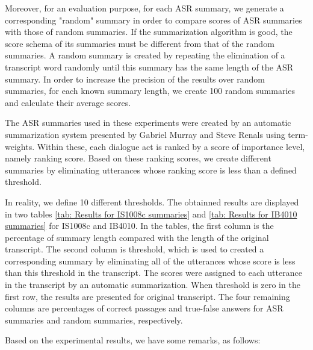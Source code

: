 Moreover, for an evaluation purpose, for each ASR summary, we generate a corresponding "random" summary in order to compare scores of ASR summaries with those of random summaries. If the summarization algorithm is good, the score schema of its summaries must be different from that of the random summaries. A random summary is created by repeating the elimination of a transcript word randomly until this summary has the same length of the ASR summary. In order to increase the precision of the results over random summaries, for each known summary length, we create 100 random summaries and calculate their average scores.

The ASR summaries used in these experiments were created by an automatic summarization system presented by Gabriel Murray and Steve Renals \cite{ASR_summaries} using term-weights. Within these, each dialogue act is ranked by a score of importance level, namely ranking score. Based on these ranking scores, we create different summaries by eliminating utterances whose ranking score is less than a defined threshold.

In reality, we define 10 different thresholds. The obtainned results are displayed in two tables \ref{tab: Results for IS1008c summaries} and \ref{tab: Results for IB4010 summaries} for IS1008c and IB4010. In the tables, the first column is the percentage of summary length compared with the length of the original transcript. The second column is threshold, which is used to created a corresponding summary by eliminating all of the utterances whose score is less than this threshold in the transcript. The scores were assigned to each utterance in the transcript by an automatic summarization. When threshold is zero in the first row, the results are presented for original transcript. The four remaining columns are percentages of correct passages and true-false answers for ASR summaries and random summaries, respectively. 

Based on the experimental results, we have some remarks, as follows:

